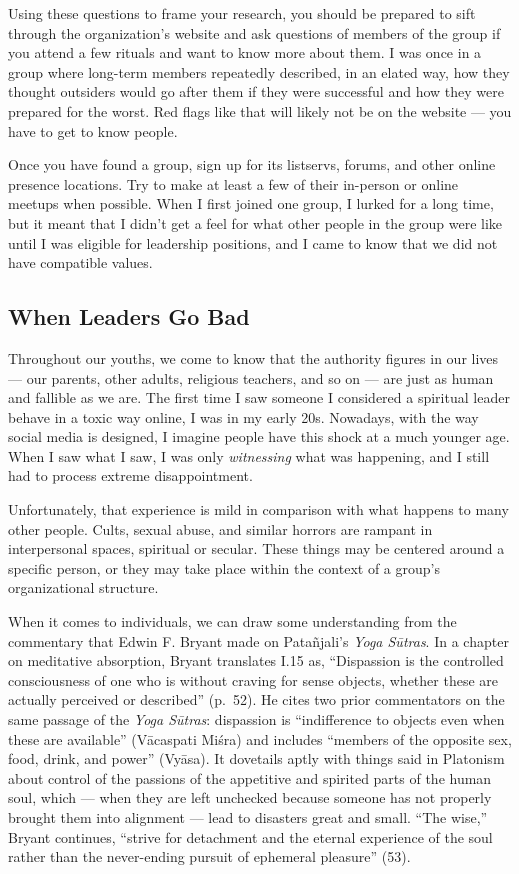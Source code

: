 \documentclass[
]{book}
\begin{document}
Using these questions to frame your research, you should be prepared to sift through the organization's website and ask questions of members of the group if you attend a few rituals and want to know more about them. I was once in a group where long-term members repeatedly described, in an elated way, how they thought outsiders would go after them if they were successful and how they were prepared for the worst. Red flags like that will likely not be on the website --- you have to get to know people.

Once you have found a group, sign up for its listservs, forums, and other online presence locations. Try to make at least a few of their in-person or online meetups when possible. When I first joined one group, I lurked for a long time, but it meant that I didn't get a feel for what other people in the group were like until I was eligible for leadership positions, and I came to know that we did not have compatible values.

\hypertarget{when-leaders-go-bad}{%
\subsection{When Leaders Go Bad}\label{when-leaders-go-bad}}

Throughout our youths, we come to know that the authority figures in our lives --- our parents, other adults, religious teachers, and so on --- are just as human and fallible as we are. The first time I saw someone I considered a spiritual leader behave in a toxic way online, I was in my early 20s. Nowadays, with the way social media is designed, I imagine people have this shock at a much younger age. When I saw what I saw, I was only \emph{witnessing} what was happening, and I still had to process extreme disappointment.

Unfortunately, that experience is mild in comparison with what happens to many other people. Cults, sexual abuse, and similar horrors are rampant in interpersonal spaces, spiritual or secular. These things may be centered around a specific person, or they may take place within the context of a group's organizational structure.

When it comes to individuals, we can draw some understanding from the commentary that Edwin F. Bryant made on Patañjali's \emph{Yoga Sūtras}. In a chapter on meditative absorption, Bryant translates I.15 as, ``Dispassion is the controlled consciousness of one who is without craving for sense objects, whether these are actually perceived or described'' (p.~52). He cites two prior commentators on the same passage of the \emph{Yoga Sūtras}: dispassion is ``indifference to objects even when these are available'' (Vācaspati Miśra) and includes ``members of the opposite sex, food, drink, and power'' (Vyāsa). It dovetails aptly with things said in Platonism about control of the passions of the appetitive and spirited parts of the human soul, which --- when they are left unchecked because someone has not properly brought them into alignment --- lead to disasters great and small. ``The wise,'' Bryant continues, ``strive for detachment and the eternal experience of the soul rather than the never-ending pursuit of ephemeral pleasure'' (53).
\end{document}
